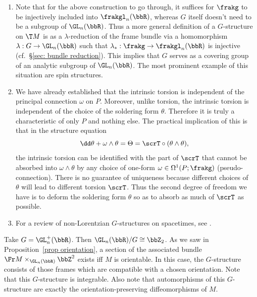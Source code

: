 \begin{rem}
    \begin{enumerate}
        \item Note that for the above construction to go through, it suffices for $\frakg$ to be injectively included into $\frakgl_n(\bbR)$, whereas $G$ itself doesn't need to be a subgroup of $\GL_n(\bbR)$. Thus a more general definition of a $G$-structure on $\T M$ is as a $\lambda$-reduction of the frame bundle via a homomorphism $\lambda:G\to \GL_n(\bbR)$ such that $\lambda_\ast:\frakg\to \frakgl_n(\bbR)$ is injective (cf.\ \S\ref{sec: bundle reduction}). This implies that $G$ serves as a covering group of an analytic subgroup of $\GL_n(\bbR)$. The most prominent example of this situation are spin structures.
        \item We have already established that the intrinsic torsion is independent of the principal connection $\omega$ on $P$. Moreover, unlike torsion, the intrinsic torsion is independent of the choice of the soldering form $\theta$. Therefore it is truly a characteristic of only $P$ and nothing else. The practical implication of this is that in the structure equation 
        \[\dd \theta+\omega\wedge\theta=\Theta=\scrT\circ (\theta\wedge\theta),\]
        the intrinsic torsion can be identified with the part of $\scrT$ that cannot be absorbed into $\omega\wedge\theta$ by any choice of one-form $\omega\in\Omega^1(P;\frakg)$ (pseudo-connection). There is no guarantee of uniqueness because different choices of $\theta$ will lead to different torsion $\scrT$. Thus the second degree of freedom we have is to deform the soldering form $\theta$ so as to absorb as much of $\scrT$ as possible. 
        \item For a review of non-Lorentzian $G$-structures on spacetimes, see \cite{OFarrill}.
    \end{enumerate}
\end{rem}


\begin{example}[Orientation]
    Take $G=\GL_n^+(\bbR)$. Then $\GL_n(\bbR)\slash G\cong \bbZ_2$. As we saw in Proposition~\ref{prop orientation}, a section of the associated bundle $\Fr M\times_{\GL_n(\bbR)}\bbZ^2$ exists iff $M$ is orientable. In this case, the $G$-structure consists of those frames which are compatible with a chosen orientation. Note that this $G$-structure is integrable. Also note that automorphisms of this $G$-structure are exactly the orientation-preserving diffeomorphisms of $M$.
\end{example}

